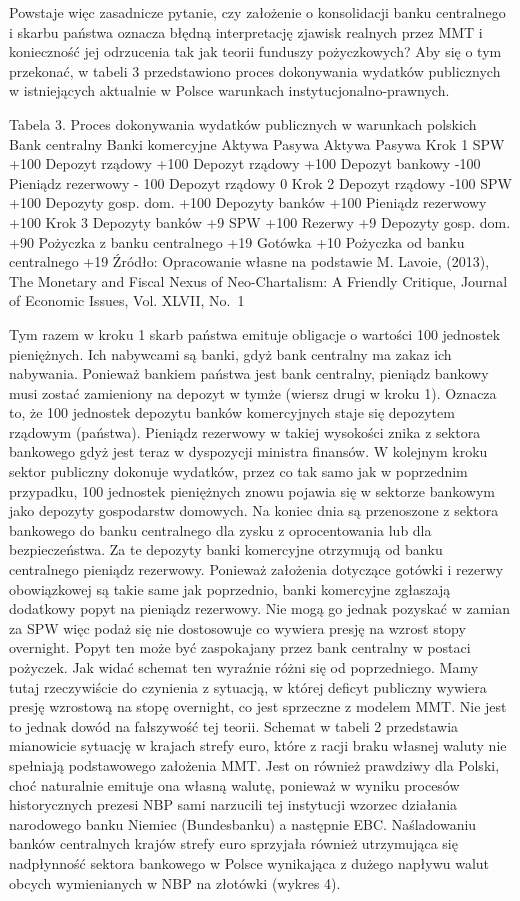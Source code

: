 \documentclass[
]{book}
\begin{document}
Powstaje więc zasadnicze pytanie, czy założenie o konsolidacji banku centralnego i skarbu państwa oznacza błędną interpretację zjawisk realnych przez MMT i konieczność jej odrzucenia tak jak teorii funduszy pożyczkowych? Aby się o tym przekonać, w tabeli 3 przedstawiono proces dokonywania wydatków publicznych w istniejących aktualnie w Polsce warunkach instytucjonalno-prawnych.

Tabela 3. Proces dokonywania wydatków publicznych w warunkach polskich
Bank centralny Banki komercyjne
Aktywa Pasywa Aktywa Pasywa
Krok 1 SPW +100 Depozyt rządowy +100
Depozyt rządowy +100
Depozyt bankowy -100 Pieniądz rezerwowy - 100 Depozyt rządowy 0
Krok 2 Depozyt rządowy -100 SPW +100 Depozyty gosp. dom. +100
Depozyty banków +100 Pieniądz rezerwowy +100
Krok 3 Depozyty banków +9
SPW +100
Rezerwy +9 Depozyty gosp. dom. +90
Pożyczka z banku centralnego +19 Gotówka +10 Pożyczka od banku centralnego +19
Źródło: Opracowanie własne na podstawie M. Lavoie, (2013), The Monetary and Fiscal Nexus of Neo-Chartalism: A Friendly Critique, Journal of Economic Issues, Vol. XLVII, No.~1

Tym razem w kroku 1 skarb państwa emituje obligacje o wartości 100 jednostek pieniężnych. Ich nabywcami są banki, gdyż bank centralny ma zakaz ich nabywania. Ponieważ bankiem państwa jest bank centralny, pieniądz bankowy musi zostać zamieniony na depozyt w tymże (wiersz drugi w kroku 1). Oznacza to, że 100 jednostek depozytu banków komercyjnych staje się depozytem rządowym (państwa). Pieniądz rezerwowy w takiej wysokości znika z sektora bankowego gdyż jest teraz w dyspozycji ministra finansów. W kolejnym kroku sektor publiczny dokonuje wydatków, przez co tak samo jak w poprzednim przypadku, 100 jednostek pieniężnych znowu pojawia się w sektorze bankowym jako depozyty gospodarstw domowych. Na koniec dnia są przenoszone z sektora bankowego do banku centralnego dla zysku z oprocentowania lub dla bezpieczeństwa. Za te depozyty banki komercyjne otrzymują od banku centralnego pieniądz rezerwowy. Ponieważ założenia dotyczące gotówki i rezerwy obowiązkowej są takie same jak poprzednio, banki komercyjne zgłaszają dodatkowy popyt na pieniądz rezerwowy. Nie mogą go jednak pozyskać w zamian za SPW więc podaż się nie dostosowuje co wywiera presję na wzrost stopy overnight. Popyt ten może być zaspokajany przez bank centralny w postaci pożyczek.
Jak widać schemat ten wyraźnie różni się od poprzedniego. Mamy tutaj rzeczywiście do czynienia z sytuacją, w której deficyt publiczny wywiera presję wzrostową na stopę overnight, co jest sprzeczne z modelem MMT. Nie jest to jednak dowód na fałszywość tej teorii. Schemat w tabeli 2 przedstawia mianowicie sytuację w krajach strefy euro, które z racji braku własnej waluty nie spełniają podstawowego założenia MMT. Jest on również prawdziwy dla Polski, choć naturalnie emituje ona własną walutę, ponieważ w wyniku procesów historycznych prezesi NBP sami narzucili tej instytucji wzorzec działania narodowego banku Niemiec (Bundesbanku) a następnie EBC. Naśladowaniu banków centralnych krajów strefy euro sprzyjała również utrzymująca się nadpłynność sektora bankowego w Polsce wynikająca z dużego napływu walut obcych wymienianych w NBP na złotówki (wykres 4).
\end{document}
